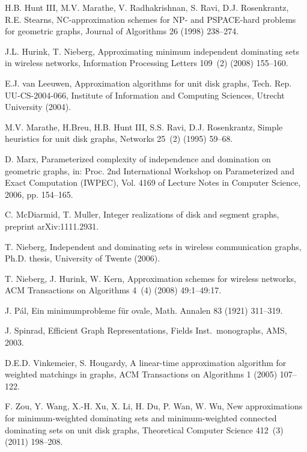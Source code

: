 \documentclass[preprint,12pt]{elsarticle}
\begin{document}
\begin{thebibliography}{10}
H.B. {Hunt III}, M.V. Marathe, V. Radhakrishnan, S. Ravi, D.J. Rosenkrantz,
  R.E. Stearns, {NC}-approximation schemes for {NP}- and {PSPACE}-hard
  problems for geometric graphs, Journal of Algorithms 26 (1998) 238--274.


J.L. Hurink, T. Nieberg, Approximating minimum independent dominating sets in
  wireless networks, Information Processing Letters 109~(2) (2008) 155--160.


E.J. van Leeuwen, Approximation algorithms for unit disk graphs, Tech. Rep.
  UU-CS-2004-066, Institute of Information and Computing Sciences, Utrecht
  University (2004).
  
M.V. Marathe, H.Breu, H.B. {Hunt III}, S.S. Ravi, D.J. Rosenkrantz, Simple
  heuristics for unit disk graphs, Networks 25~(2) (1995) 59--68.

D. Marx, Parameterized complexity of independence and domination on
geometric graphs,
in: Proc. 2nd International Workshop on Parameterized and Exact
Computation (IWPEC),
Vol. 4169 of  Lecture Notes in Computer Science, 2006, pp. 154--165.


C. McDiarmid, T. Muller, Integer realizations of disk and segment graphs,
  preprint arXiv:1111.2931.


T. Nieberg, Independent and dominating sets in wireless communication graphs,
  Ph.D. thesis, University of Twente (2006).
  
T. Nieberg, J. Hurink, W. Kern, Approximation schemes for wireless networks,
  ACM Transactions on Algorithms 4~(4) (2008) 49:1--49:17.


J. P\'al, Ein minimumprobleme f\"ur ovale, Math. Annalen 83 (1921) 311--319.



J. Spinrad, Efficient Graph Representations, Fields Inst.~monographs, AMS,
  2003.

D.E.D. Vinkemeier, S. Hougardy, A linear-time approximation algorithm for
  weighted matchings in graphs, ACM Transactions on Algorithms 1 (2005)
  107--122.

F. Zou, Y. Wang, X.-H. Xu, X. Li, H. Du, P. Wan, W. Wu, New approximations for
  minimum-weighted dominating sets and minimum-weighted connected dominating
  sets on unit disk graphs, Theoretical Computer Science 412~(3) (2011)
  198--208.


\end{thebibliography}
\end{document}
